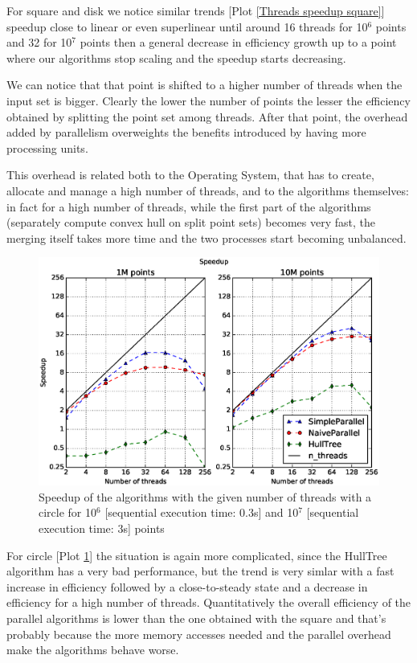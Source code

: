 \documentclass[letterpaper]{article}
\theoremstyle{definition}
\begin{document}
For square and disk we notice similar trends [Plot \ref{Threads speedup square}] speedup close to linear or even superlinear until around 16 threads for 10$^6$ points and 32 for 10$^7$ points then a general decrease in efficiency growth up to a point where our algorithms stop scaling and the speedup starts decreasing.

We can notice that that point is shifted to a higher number of threads when the input set is bigger. Clearly the lower the number of points the lesser the efficiency obtained by splitting the point set among threads.
After that point, the overhead added by parallelism overweights the benefits introduced by having more processing units.

This overhead is related both to the Operating System, that has to create, allocate and manage a high number of threads, and to the algorithms themselves:
in fact for a high number of threads, while the first part of the algorithms (separately compute convex hull on split point sets) becomes very fast, the merging itself takes more time and the two processes start becoming unbalanced.

\begin{figure}[!ht]\centering
  \includegraphics[scale=0.33]{./plots/speedup_xeon_circle_fixed_points.eps}
  \caption{Speedup of the algorithms with the given number of threads with a circle for 10$^6$ [sequential execution time: 0.3s] and 10$^7$ [sequential execution time: 3s] points\label{Threads speedup circle}}
\end{figure}

For circle [Plot \ref{Threads speedup circle}] the situation is again more complicated, since the HullTree algorithm has a very bad performance, but the trend is very simlar with a fast increase in efficiency followed by a close-to-steady state and a decrease in efficiency for a high number of threads.
Quantitatively the overall efficiency of the parallel algorithms is lower than the one obtained with the square and that's probably because the more memory accesses needed and the parallel overhead make the algorithms behave worse.
\end{document}
